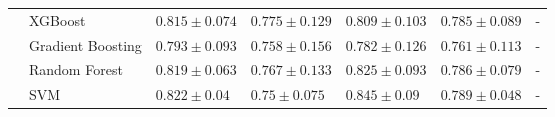 \documentclass[12pt,a4paper]{standalone}
\begin{document}
\begin{tabular}{lllllll}
                                    & XGBoost           & $0.815 \pm 0.074$                            & \cellcolor{gray!50}$\mathbf{0.775 \pm 0.129}$ & $0.809 \pm 0.103$                             & $0.785 \pm 0.089$                             & - \\ \nopagebreak
                                    & Gradient Boosting & $0.793 \pm 0.093$                            & $0.758 \pm 0.156$                             & $0.782 \pm 0.126$                             & $0.761 \pm 0.113$                             & - \\ \nopagebreak
                                    & Random Forest     & $0.819 \pm 0.063$                            & $0.767 \pm 0.133$                             & $0.825 \pm 0.093$                             & $0.786 \pm 0.079$                             & - \\ \nopagebreak
                                    & SVM               & \cellcolor{gray!50}$\mathbf{0.822 \pm 0.04}$ & $0.75 \pm 0.075$                              & \cellcolor{gray!50}$0.845 \pm 0.09$           & \cellcolor{gray!50}$\mathbf{0.789 \pm 0.048}$ & - \\ \midrule
\end{tabular}
\end{document}
